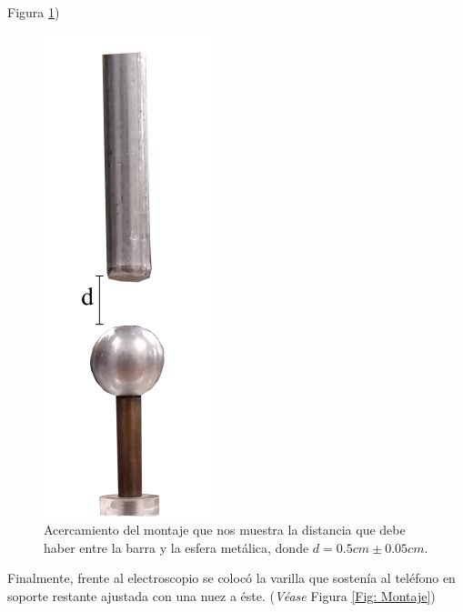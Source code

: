 \documentclass[10pt,journal]{IEEEtran}
\begin{document}
Figura \ref{Fig: Distancia})\\
\begin{figure}
\begin{center}
\includegraphics[scale=0.3]{Figuras/distancia_1.png} 
\end{center}
\caption{Acercamiento del montaje que nos muestra la distancia que debe haber entre la barra y la esfera metálica, donde $d = 0.5cm \pm 0.05 cm$.}
\label{Fig: Distancia}
\end{figure}
Finalmente, frente al electroscopio se colocó la varilla que sostenía al teléfono en soporte restante ajustada con una nuez a éste. (\textit{Véase} Figura \ref{Fig: Montaje})
\end{document}
